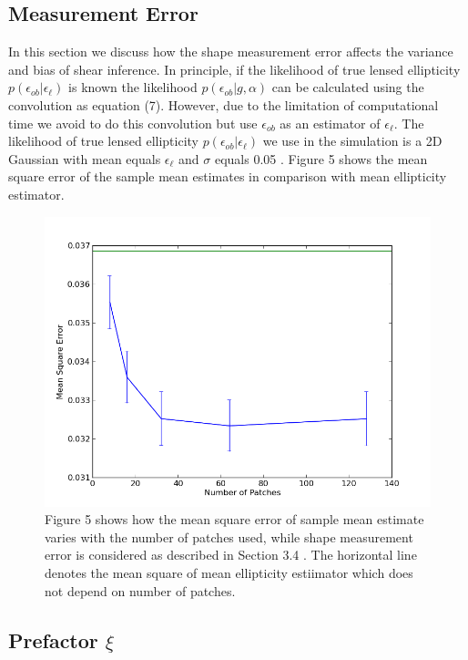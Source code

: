\documentclass[useAMS,usenatbib]{mn2e}
\begin{document}
\subsection{Measurement Error}
In this section we  discuss how the shape measurement error 
affects the variance and bias of shear inference.
In principle, if the likelihood of true lensed ellipticity $p(\epsilon_{ob}|\epsilon_{\ell})$
is known the likelihood $p(\epsilon_{ob}|g,\alpha)$ can be calculated using the convolution as equation (7).
However, due to the limitation of computational time we avoid to do this convolution but use $\epsilon_{ob}$
as an estimator of $\epsilon_{\ell}$.
The likelihood of true lensed ellipticity $p(\epsilon_{ob}|\epsilon_{\ell})$ we use in the simulation is a 2D
Gaussian with mean equals $\epsilon_{\ell}$ and $\sigma$ equals 0.05 .
Figure 5 shows the mean square error of the sample mean estimates in comparison with mean ellipticity estimator.
\begin{figure}
\includegraphics[scale=0.48]{fig/errorN8}
\caption{Figure 5 shows how the mean square error of sample mean estimate varies with the number of patches used, while shape measurement error is considered as described in Section 3.4 .
The horizontal line denotes the mean square of mean ellipticity estiimator which does not depend on number of patches. }
\end{figure}



\subsection{Prefactor $\xi$}
\end{document}
